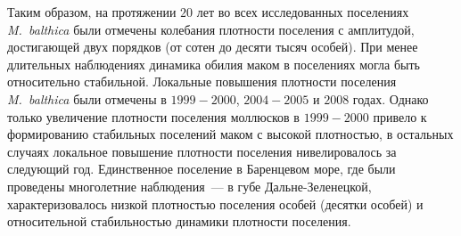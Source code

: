 \bigskip
Таким образом, на протяжении $20$ лет во всех исследованных поселениях \textit{M.~balthica} были отмечены колебания плотности поселения с амплитудой, достигающей двух порядков (от сотен до десяти тысяч особей).
При менее длительных наблюдениях динамика обилия маком в поселениях могла быть относительно стабильной.
Локальные повышения плотности поселения \textit{M.~balthica} были отмечены в $1999-2000$, $2004-2005$ и $2008$ годах.
Однако только увеличение плотности поселения моллюсков в $1999-2000$ привело к формированию стабильных поселений маком с высокой плотностью, в остальных случаях локальное повышение плотности поселения нивелировалось за следующий год.
Единственное поселение в Баренцевом море, где были проведены многолетние наблюдения~--- в губе Дальне-Зеленецкой, характеризовалось низкой плотностью поселения особей (десятки особей) и относительной стабильностью динамики плотности поселения. 



\afterpage{\clearpage}
